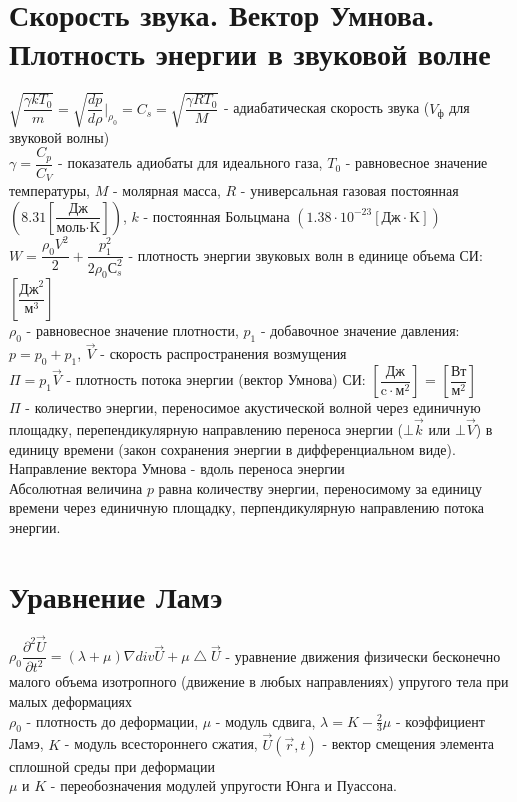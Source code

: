 \begin{multicols*}{2}
		\section{Скорость звука. Вектор Умнова. Плотность энергии в звуковой волне}
		$\sqrt{\dfrac{\gamma k T_0}{m}} = \sqrt{\dfrac{dp}{d\rho}}\bigg|_{\rho_0} = C_s = \sqrt{\dfrac{\gamma R T_0}{M}}$ - адиабатическая скорость звука ($V_\text{ф}$ для звуковой волны)\\
		$\gamma = \dfrac{C_p}{C_V}$ - показатель адиобаты для идеального газа, $T_0$ - равновесное значение температуры, $M$ - молярная масса, $R$ - универсальная газовая постоянная $\left(8.31 \left[\dfrac{\text{Дж}}{\text{моль}\cdot\text{K}}\right]\right)$, $k$ - постоянная Больцмана $\left(1.38\cdot10^{-23} \left[{\text{Дж}} \cdot \text{K}\right]\right)$\\
		$W = \dfrac{\rho_0 V^2}{2} + \dfrac{p_1^2}{2\rho_0 С_s^2}$ - плотность энергии звуковых волн в единице объема \quad СИ: $\left[\dfrac{\text{Дж}^2}{\text{м}^3}\right]$\\
		$\rho_0$ - равновесное значение плотности, $p_1$ - добавочное значение давления: $p = p_0 + p_1$, $\vec{V}$ - скорость распространения возмущения\\
		$\Pi = p_1 \vec{V}$ - плотность потока энергии (вектор Умнова) \quad СИ: $\left[\dfrac{\text{Дж}}{\text{c}\cdot \text{м}^2}\right]$ = $\left[\dfrac{\text{Вт}}{\text{м}^2}\right]$\\
		$\Pi$ - количество энергии, переносимое акустической волной через единичную площадку, перепендикулярную направлению переноса энергии ($\bot \vec{k}$ или $\bot \vec{V}$) в единицу времени (закон сохранения энергии в дифференциальном виде). Направление вектора Умнова - вдоль переноса энергии\\
		Абсолютная величина $p$ равна количеству энергии, переносимому за единицу времени через единичную площадку, перпендикулярную направлению потока энергии.

		\section{Уравнение Ламэ}
		$\rho_0 \dfrac{\partial^2 \vec{U}}{\partial t^2} = (\lambda + \mu) \nabla div \vec{U} + \mu \bigtriangleup  \vec{U}$ - уравнение движения физически бесконечно малого объема изотропного (движение в любых направлениях) упругого тела при малых деформациях\\
		$\rho_0$ - плотность до деформации, $\mu$ - модуль сдвига, $\lambda = K - \frac{2}{3}\mu$ - коэффициент Ламэ, $K$ - модуль всестороннего сжатия, $\vec{U}(\vec{r}, t)$ - вектор смещения элемента сплошной среды при деформации\\
		$\mu$ и $K$ - переобозначения модулей упругости Юнга и Пуассона.


\end{multicols*}
